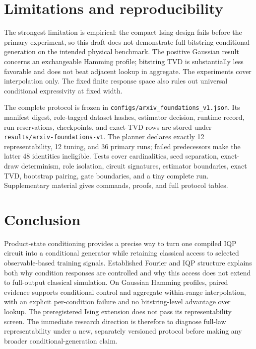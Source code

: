 \documentclass[a4paper,twocolumn,11pt,unpublished]{quantumarticle}
\begin{document}
\section{Limitations and reproducibility}

The strongest limitation is empirical: the compact Ising design fails before
the primary experiment, so this draft does not demonstrate full-bitstring
conditional generation on the intended physical benchmark.  The positive
Gaussian result concerns an exchangeable Hamming profile; bitstring TVD is
substantially less favorable and does not beat adjacent lookup in aggregate.
The experiments cover interpolation only.  The fixed finite response space
also rules out universal conditional expressivity at fixed width.

The complete protocol is frozen in
\texttt{configs/arxiv\_foundations\_v1.json}.  Its manifest digest, role-tagged
dataset hashes, estimator decision, runtime record, run reservations,
checkpoints, and exact-TVD rows are stored under
\texttt{results/arxiv-foundations-v1}.  The planner declares exactly 12
representability, 12 tuning, and 36 primary runs; failed predecessors make the
latter 48 identities ineligible.  Tests cover cardinalities, seed separation,
exact-draw determinism, role isolation, circuit signatures, estimator
boundaries, exact TVD, bootstrap pairing, gate boundaries, and a tiny complete
run.  Supplementary material gives commands, proofs, and full protocol tables.

\section{Conclusion}

Product-state conditioning provides a precise way to turn one compiled IQP
circuit into a conditional generator while retaining classical access to
selected observable-based training signals.  Established Fourier and IQP
structure explains both why condition responses are controlled and why this
access does not extend to full-output classical simulation.  On Gaussian
Hamming profiles, paired evidence supports conditional control and aggregate
within-range interpolation, with an explicit per-condition failure and no
bitstring-level advantage over lookup.  The preregistered Ising extension does
not pass its representability screen.  The immediate research direction is
therefore to diagnose full-law representability under a new, separately
versioned protocol before making any broader conditional-generation claim.
\end{document}
